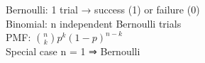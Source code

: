 \documentclass[preview]{standalone}
\begin{document}
Bernoulli: 1 trial → success (1) or failure (0)\\Binomial: n independent Bernoulli trials\\PMF: $\displaystyle {n \choose k} p^{k}(1-p)^{n-k}$\\Special case n = 1 ⇒ Bernoulli\\
\end{document}
